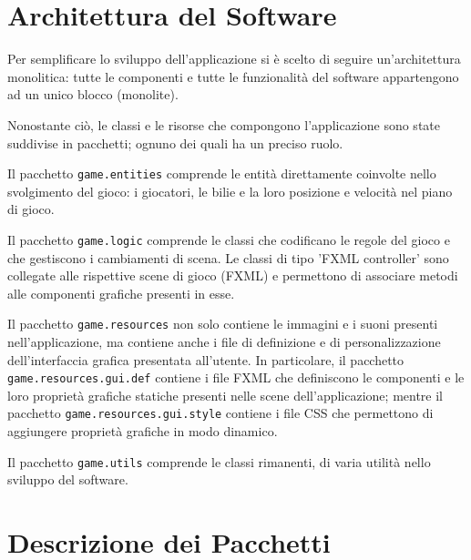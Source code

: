 \documentclass[12pt,a4paper]{report}
\begin{document}
\section{Architettura del Software} \label{se:Software Architecture} %

Per semplificare lo sviluppo dell'applicazione si è scelto di seguire un'architettura monolitica: tutte le componenti e tutte le funzionalità del software appartengono ad un unico blocco (monolite).

Nonostante ciò, le classi e le risorse che compongono l'applicazione sono state suddivise in pacchetti; ognuno dei quali ha un preciso ruolo.

\vspace{3mm}

Il pacchetto \texttt{game.entities} comprende le entità direttamente coinvolte nello svolgimento del gioco: i giocatori, le bilie e la loro posizione e velocità nel piano di gioco.

\vspace{3mm}

Il pacchetto \texttt{game.logic} comprende le classi che codificano le regole del gioco e che gestiscono i cambiamenti di scena.
Le classi di tipo 'FXML controller' sono collegate alle rispettive scene di gioco (FXML) e permettono di associare metodi alle componenti grafiche presenti in esse.

\vspace{3mm}

Il pacchetto \texttt{game.resources} non solo contiene le immagini e i suoni presenti nell'applicazione, ma contiene anche i file di definizione e di personalizzazione dell'interfaccia grafica presentata all'utente.
In particolare, il pacchetto \texttt{game.resources.gui.def} contiene i file FXML che definiscono le componenti e le loro proprietà grafiche statiche presenti nelle scene dell'applicazione; mentre il pacchetto \texttt{game.resources.gui.style} contiene i file CSS che permettono di aggiungere proprietà grafiche in modo dinamico.

\vspace{3mm}

Il pacchetto \texttt{game.utils} comprende le classi rimanenti, di varia utilità nello sviluppo del software.

\section{Descrizione dei Pacchetti} \label{se:Packages Description} %
\end{document}
